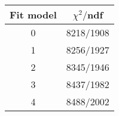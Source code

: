 \begin{tabular}{c|c}
Fit model & $\chi^2/$ndf \\
\hline
0 & 8218/1908\\
1 & 8256/1927\\
2 & 8345/1946\\
3 & 8437/1982\\
4 & 8488/2002\\
\end{tabular}
